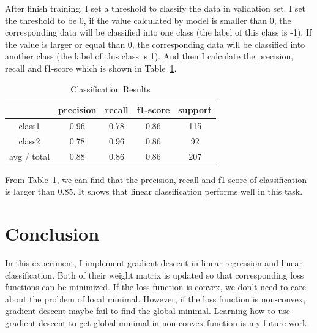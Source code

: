\documentclass[journal, a4paper]{IEEEtran}
\begin{document}
After finish training, I set a threshold to classify the data in validation set. I set the threshold to be 0, if the value calculated by model is smaller than 0, the corresponding data will be classified into one class (the label of this class is -1). If the value is larger or equal than 0, the corresponding data will be classified into another class (the label of this class is 1). And then I calculate the precision, recall and f1-score which is shown in Table~\ref{table_1}.

    \begin{table}[!hbt]
		\begin{center}
		\caption{Classification Results}
		\label{table_1}
		\begin{tabular}{|c|c|c|c|c|}
			\hline
			  & precision & recall & f1-score & support \\
			\hline
			class1 & 0.96 & 0.78 & 0.86  & 115 \\
			\hline
			class2 & 0.78 & 0.96 & 0.86  & 92 \\
			\hline
			avg / total & 0.88 & 0.86 & 0.86 & 207 \\
			\hline
		\end{tabular}
		\end{center}
	\end{table}

From Table~\ref{table_1}, we can find that the precision, recall and f1-score of classification is larger than 0.85. It shows that linear classification performs well in this task.

\section{Conclusion}
In this experiment, I implement gradient descent in linear regression and linear classification. Both of their weight matrix is updated so that corresponding loss functions can be minimized. If the loss function is convex, we don't need to care about the problem of local minimal. However, if the loss function is non-convex, gradient descent maybe fail to find the global minimal. Learning how to use gradient descent to get global minimal in non-convex function is my future work.

\end{document}
